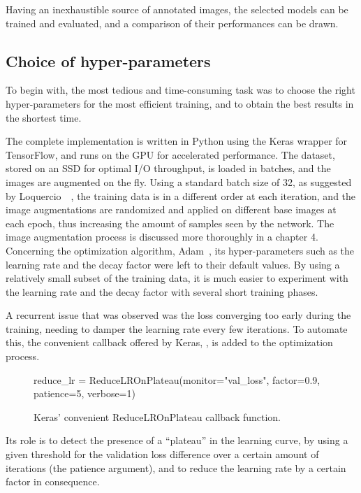 Having an inexhaustible source of annotated images, the selected models can be
trained and evaluated, and a comparison of their performances can be drawn.

\subsection{Choice of hyper-parameters}

To begin with, the most tedious and time-consuming task was to choose the right
hyper-parameters for the most efficient training, and to obtain the best
results in the shortest time.

The complete implementation is written in Python using the Keras wrapper for
TensorFlow, and runs on the GPU for accelerated performance. The dataset,
stored on an SSD for optimal I/O throughput, is loaded in batches, and the
images are augmented on the fly. Using a standard batch size of 32, as suggested
by Loquercio~\etal~\cite{dronet}, the training data is in a different order at
each iteration, and the image augmentations are randomized and applied on
different base images at each epoch, thus increasing the amount of samples seen
by the network. The image augmentation process is discussed more thoroughly in
a chapter 4.\\

Concerning the optimization algorithm, Adam~\cite{Adam}, its hyper-parameters
such as the learning rate and the decay factor were left to their default
values. By using a relatively small subset of the training data, it is much
easier to experiment with the learning rate and the decay factor with several
short training phases.

A recurrent issue that was observed was the loss converging too early during
the training, needing to damper the learning rate every few iterations. To
automate this, the convenient callback offered by Keras,
, is added to the optimization process.

\begin{figure}[h]
    \centering
    \caption{Keras' convenient ReduceLROnPlateau callback function.}
    \begin{python}
        reduce_lr = ReduceLROnPlateau(monitor="val_loss",
            factor=0.9, patience=5, verbose=1)
    \end{python}
\end{figure}

Its role is to detect the presence of a ``plateau'' in the learning curve, by
using a given threshold for the validation loss difference over a certain
amount of iterations (the patience argument), and to reduce the learning rate
by a certain factor in consequence.\\

